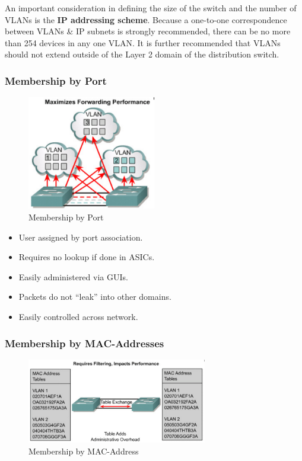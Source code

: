 \documentclass[a4paper,11pt]{article}
\begin{document}
An important consideration in defining the size of the switch and the number of VLANs is the \textbf{IP addressing scheme}.
Because a one-to-one correspondence between VLANs \& IP subnets is strongly recommended, there can be no more than 254 
devices in any one VLAN. 
It is further recommended that VLANs should not extend outside of the Layer 2 domain of the distribution switch.

\subsubsection{Membership by Port}
\begin{figure}[H]
    \centering
    \includegraphics[width=0.5\textwidth]{./images/membership_by_port.png}
    \caption{Membership by Port}
\end{figure}

\begin{itemize}
    \item   User assigned by port association. 
    \item   Requires no lookup if done in ASICs. 
    \item   Easily administered via GUIs. 
    \item   Packets do not ``leak'' into other domains. 
    \item   Easily controlled across network.
\end{itemize}

\subsubsection{Membership by MAC-Addresses}
\begin{figure}[H]
    \centering
    \includegraphics[width=0.7\textwidth]{./images/membership_by_mac.png}
    \caption{Membership by MAC-Address}
\end{figure}
\end{document}

